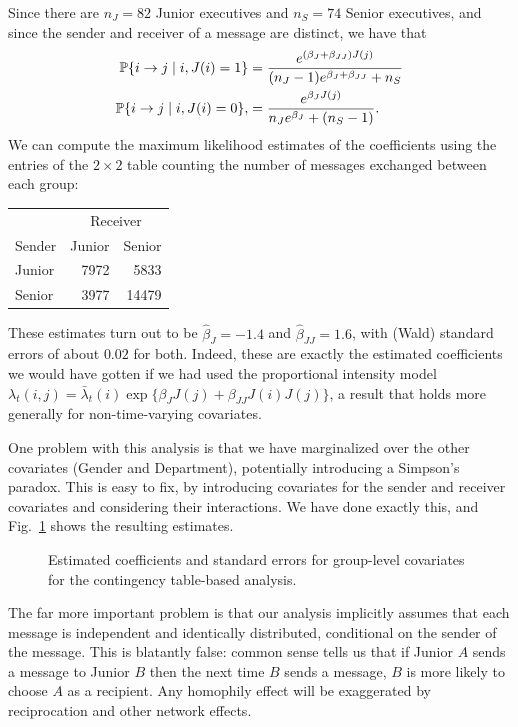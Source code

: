 \documentclass[final]{statsoc}
\begin{document}
Since there are $n_J = 82$ Junior
executives and $n_S = 74$ Senior executives, and since the sender and
receiver of a message are distinct, we have that
\begin{align*}
  \mathbb{P}\{ i \to j \mid i, J(i) = 1 \}
    &=
      \frac{e^{(\beta_J + \beta_{JJ}) J(j)}}
           {(n_J - 1) e^{\beta_J + \beta_{JJ}} + n_S} \\
  \mathbb{P}\{ i \to j \mid i, J(i) = 0 \},
    &= 
      \frac{e^{\beta_J J(j)}}
           {n_J e^{\beta_J} + (n_S - 1)}.
\end{align*}
We can compute the maximum likelihood estimates of the coefficients using the
entries of the $2 \times 2$ table counting the number of messages exchanged
between each group:
\begin{center}
\begin{tabular}{lrr}
  \toprule
  & \multicolumn{2}{c}{Receiver} \\
  \cmidrule(l){2-3}
  Sender & Junior & Senior \\
  \midrule
  Junior &  7972  &  5833 \\
  Senior &  3977  & 14479 \\
  \bottomrule
\end{tabular}
\end{center}
These estimates turn out to be $\hat \beta_{J} = -1.4$ and
$\hat \beta_{JJ} = 1.6$, with (Wald) standard errors of about $0.02$
for both.  Indeed, these are exactly the estimated coefficients we would
have gotten if we had used the proportional intensity model
$\lambda_t(i,j) = \bar \lambda_t(i) \exp\{ \beta_J J(j) + \beta_{JJ} J(i) J(j)
\}$, a result that holds more generally for non-time-varying covariates.

One problem with this analysis is that we have marginalized over the
other covariates (Gender and Department), potentially introducing a Simpson's
paradox.  This is easy to fix, by introducing covariates for the sender and
receiver covariates and considering their interactions.   We have done
exactly this, and Fig.~\ref{T:group-static} shows the resulting estimates.  

\begin{figure}[h]
  \centering
  \makebox[\textwidth]{
    \scriptsize
    
  }
  \caption{
    Estimated coefficients and standard errors for group-level covariates
    for the contingency table-based analysis.
  }
  \label{T:group-static}
\end{figure}

The far more important
problem is that our analysis implicitly assumes that each message is
independent and identically distributed, conditional on the sender of
the message.  This is blatantly false: common sense tells us that if Junior $A$ sends a message
to Junior $B$ then the next time $B$ sends a message, $B$ is more likely to
choose $A$ as a recipient.  Any homophily effect will be exaggerated by
reciprocation and other network effects.
\end{document}
